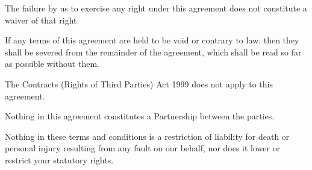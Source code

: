 The failure by us to exercise any right under this agreement does not
constitute a waiver of that right.

If any terms of this agreement are held to be void or contrary to law,
then they shall be severed from the remainder of the agreement, which
shall be read so far as possible without them.

The Contracts (Rights of Third Parties) Act 1999 does not apply to this
agreement.

Nothing in this agreement constitutes a Partnership between the parties.

Nothing in these terms and conditions is a restriction of liability for
death or personal injury resulting from any fault on our behalf, nor
does it lower or restrict your statutory rights.
